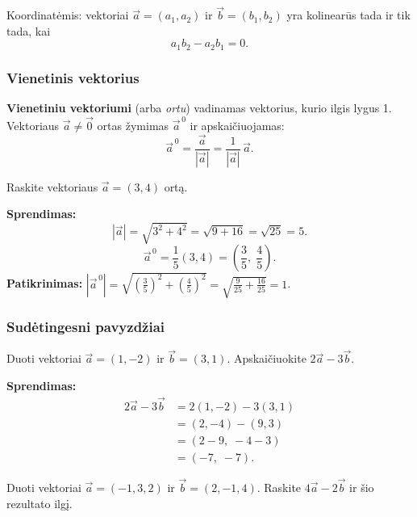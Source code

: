 \begin{remark}
Koordinatėmis: vektoriai $\vec{a} = (a_1, a_2)$ ir $\vec{b} = (b_1, b_2)$ yra kolinearūs
tada ir tik tada, kai
\[
  a_1 b_2 - a_2 b_1 = 0.
\]
\end{remark}

\subsubsection*{Vienetinis vektorius}

\begin{definition}
\textbf{Vienetiniu vektoriumi} (arba \emph{ortu}) vadinamas vektorius, kurio ilgis lygus 1.
Vektoriaus $\vec{a} \ne \vec{0}$ ortas žymimas $\vec{a}^{\,0}$ ir apskaičiuojamas:
\[
  \vec{a}^{\,0} = \frac{\vec{a}}{|\vec{a}|} = \frac{1}{|\vec{a}|}\,\vec{a}.
\]
\end{definition}

\begin{example}
Raskite vektoriaus $\vec{a} = (3, 4)$ ortą.

\textbf{Sprendimas:}
\[
  |\vec{a}| = \sqrt{3^2 + 4^2} = \sqrt{9 + 16} = \sqrt{25} = 5.
\]
\[
  \vec{a}^{\,0} = \frac{1}{5}(3, 4) = \left(\frac{3}{5},\; \frac{4}{5}\right).
\]
\textbf{Patikrinimas:} $\left|\vec{a}^{\,0}\right| = \sqrt{\left(\tfrac{3}{5}\right)^2 + \left(\tfrac{4}{5}\right)^2} = \sqrt{\tfrac{9}{25}+\tfrac{16}{25}} = 1$. \checkmark
\end{example}

\subsubsection*{Sudėtingesni pavyzdžiai}

\begin{example}
Duoti vektoriai $\vec{a} = (1, -2)$ ir $\vec{b} = (3, 1)$. Apskaičiuokite $2\vec{a} - 3\vec{b}$.

\textbf{Sprendimas:}
\begin{align*}
  2\vec{a} - 3\vec{b}
    &= 2(1, -2) - 3(3, 1) \\
    &= (2, -4) - (9, 3) \\
    &= (2 - 9,\; -4 - 3) \\
    &= (-7,\; -7).
\end{align*}
\end{example}

\begin{exercise}
Duoti vektoriai $\vec{a} = (-1, 3, 2)$ ir $\vec{b} = (2, -1, 4)$.
Raskite $4\vec{a} - 2\vec{b}$ ir šio rezultato ilgį.
\end{exercise}

